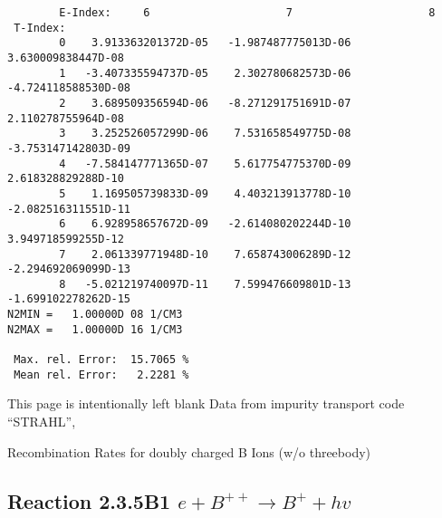 \documentclass[12pt,dvipdfmx]{article}
\begin{document}
\begin{small}
\begin{verbatim}
        E-Index:     6                     7                     8
 T-Index:
        0    3.913363201372D-05   -1.987487775013D-06    3.630009838447D-08
        1   -3.407335594737D-05    2.302780682573D-06   -4.724118588530D-08
        2    3.689509356594D-06   -8.271291751691D-07    2.110278755964D-08
        3    3.252526057299D-06    7.531658549775D-08   -3.753147142803D-09
        4   -7.584147771365D-07    5.617754775370D-09    2.618328829288D-10
        5    1.169505739833D-09    4.403213913778D-10   -2.082516311551D-11
        6    6.928958657672D-09   -2.614080202244D-10    3.949718599255D-12
        7    2.061339771948D-10    7.658743006289D-12   -2.294692069099D-13
        8   -5.021219740097D-11    7.599476609801D-13   -1.699102278262D-15
N2MIN =   1.00000D 08 1/CM3
N2MAX =   1.00000D 16 1/CM3

 Max. rel. Error:  15.7065 %
 Mean rel. Error:   2.2281 %

\end{verbatim}\end{small}
\newpage
This page is intentionally left blank
\newpage
Data from impurity transport code ``STRAHL'', \cite{kn:Behringer}

  Recombination Rates for doubly charged B Ions (w/o threebody)
\subsection{
Reaction 2.3.5B1  $e + B^{++} \rightarrow B^+ + hv$
}
\end{document}
